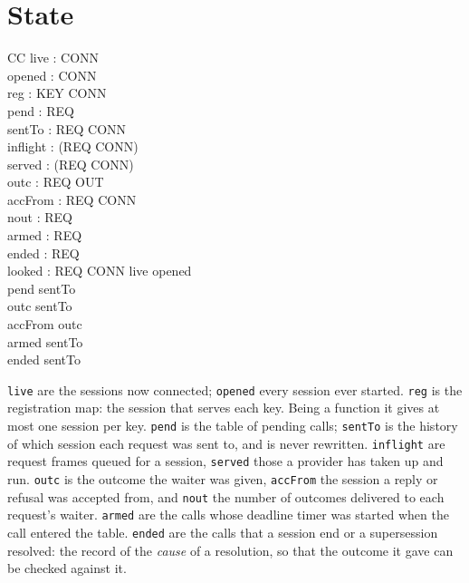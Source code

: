 \documentclass[a4paper,10pt,fleqn]{article}
\begin{document}
\section{State}

\begin{schema}{CC}
  live : \power CONN \\
  opened : \power CONN \\
  reg : KEY \pfun CONN \\
  pend : \power REQ \\
  sentTo : REQ \pfun CONN \\
  inflight : \power (REQ \cross CONN) \\
  served : \power (REQ \cross CONN) \\
  outc : REQ \pfun OUT \\
  accFrom : REQ \pfun CONN \\
  nout : REQ   \\
  armed : \power REQ \\
  ended : \power REQ \\
  looked : REQ \pfun CONN
\where
  live \subseteq opened \\
  pend \subseteq \dom sentTo \\
  \dom outc \subseteq \dom sentTo \\
  \dom accFrom \subseteq \dom outc \\
  armed \subseteq \dom sentTo \\
  ended \subseteq \dom sentTo
\end{schema}

\texttt{live} are the sessions now connected; \texttt{opened} every session
ever started.  \texttt{reg} is the registration map: the session that serves
each key.  Being a function it gives at most one session per key.
\texttt{pend} is the table of pending calls; \texttt{sentTo} is the history
of which session each request was sent to, and is never rewritten.
\texttt{inflight} are request frames queued for a session, \texttt{served}
those a provider has taken up and run.  \texttt{outc} is the outcome the
waiter was given, \texttt{accFrom} the session a reply or refusal was
accepted from, and \texttt{nout} the number of outcomes delivered to each
request's waiter.  \texttt{armed} are the calls whose deadline timer was
started when the call entered the table.  \texttt{ended} are the calls that
a session end or a supersession resolved: the record of the \emph{cause} of
a resolution, so that the outcome it gave can be checked against it.
\end{document}

